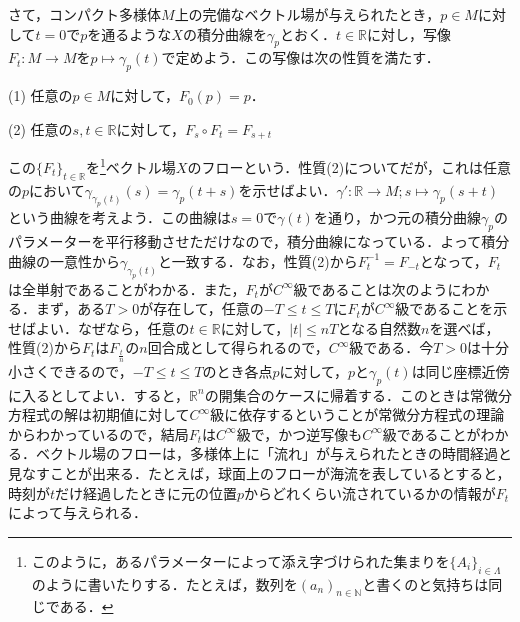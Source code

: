 \documentclass{jsarticle}
\def\realnum{{\mathbb R}}
\begin{document}
さて，コンパクト多様体$M$上の完備なベクトル場が与えられたとき，$p\in M$に対して$t=0$で$p$を通るような$X$の積分曲線を$\gamma_p$とおく．$t\in\realnum$に対し，写像$F_t:M\rightarrow M$を$p\mapsto \gamma_p(t)$で定めよう．この写像は次の性質を満たす．
\begin{description}
\item{(1)} 任意の$p\in M$に対して，$F_0(p)=p$．
\item{(2)} 任意の$s,t\in\realnum$に対して，$F_s\circ F_t=F_{s+t}$
\end{description}
この$\{F_t\}_{t\in\realnum}$を\footnote{このように，あるパラメーターによって添え字づけられた集まりを$\{A_i\}_{i\in \Lambda}$のように書いたりする．たとえば，数列を$(a_n)_{n\in {\mathbb N}}$と書くのと気持ちは同じである．}ベクトル場$X$のフローという．性質(2)についてだが，これは任意の$p$において$\gamma_{\gamma_p(t)}(s)=\gamma_p(t+s)$を示せばよい．$\gamma':\realnum\rightarrow M;s\mapsto\gamma_p(s+t)$という曲線を考えよう．この曲線は$s=0$で$\gamma(t)$を通り，かつ元の積分曲線$\gamma_p$のパラメーターを平行移動させただけなので，積分曲線になっている．よって積分曲線の一意性から$\gamma_{\gamma_p(t)}$と一致する．なお，性質(2)から$F_t^{-1}=F_{-t}$となって，$F_t$は全単射であることがわかる．また，$F_t$が$C^\infty$級であることは次のようにわかる．まず，ある$T>0$が存在して，任意の$-T\le t\le T$に$F_t$が$C^\infty$級であることを示せばよい．なぜなら，任意の$t\in\realnum$に対して，$|t| \le nT$となる自然数$n$を選べば，性質(2)から$F_t$は$F_{\frac{t}{n}}$の$n$回合成として得られるので，$C^\infty$級である．今$T>0$は十分小さくできるので，$-T\le t \le T$のとき各点$p$に対して，$p$と$\gamma_p(t)$は同じ座標近傍に入るとしてよい．すると，$\realnum^n$の開集合のケースに帰着する．このときは常微分方程式の解は初期値に対して$C^\infty$級に依存するということが常微分方程式の理論からわかっているので，結局$F_t$は$C^\infty$級で，かつ逆写像も$C^\infty$級であることがわかる．ベクトル場のフローは，多様体上に「流れ」が与えられたときの時間経過と見なすことが出来る．たとえば，球面上のフローが海流を表しているとすると，時刻が$t$だけ経過したときに元の位置$p$からどれくらい流されているかの情報が$F_t$によって与えられる．
\end{document}

